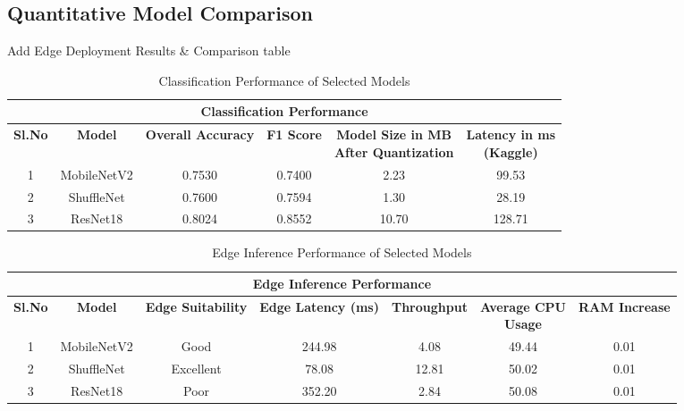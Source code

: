 \subsection {Quantitative Model Comparison}

Add Edge Deployment Results \& Comparison table


\begin{table}[htbp]
\centering

\footnotesize
\renewcommand{\arraystretch}{1.3}
\setlength{\tabcolsep}{5pt}

\begin{tabular}{|c|c|c|c|c|c|}
\hline
\multicolumn{6}{|c|}{\textbf{Classification Performance}} \\
\hline

\rowcolor{yellow}
\textbf{Sl.No} &
\textbf{Model} &
\textbf{Overall Accuracy} &
\textbf{F1 Score} &
\makecell{\textbf{Model Size in MB} \\ \textbf{After Quantization}} &
\makecell{\textbf{Latency in ms} \\ \textbf{(Kaggle)}} \\
\hline

1 & MobileNetV2 & 0.7530 & 0.7400 & 2.23 & 99.53 \\
\hline
2 & ShuffleNet  & 0.7600 & 0.7594 & 1.30 & 28.19 \\
\hline
3 & ResNet18    & 0.8024 & 0.8552 & 10.70 & 128.71 \\
\hline

\end{tabular}
\caption{Classification Performance of Selected Models}
\label{tab:classification_performance}
\end{table}

\begin{table}[htbp]
\centering

\scriptsize
\renewcommand{\arraystretch}{1.3}
\setlength{\tabcolsep}{5pt}

\begin{tabular}{|c|c|c|c|c|c|c|}
\hline
\multicolumn{7}{|c|}{\textbf{Edge Inference Performance}} \\
\hline

\rowcolor{yellow}
\textbf{Sl.No} &
\textbf{Model} &
\textbf{Edge Suitability} &
\textbf{Edge Latency (ms)} &
\textbf{Throughput} &
\makecell{\textbf{Average CPU} \\ \textbf{Usage}} &
\textbf{RAM Increase} \\
\hline

1 & MobileNetV2 & Good      & 244.98 & 4.08  & 49.44 & 0.01 \\
\hline
2 & ShuffleNet  & Excellent & 78.08  & 12.81 & 50.02 & 0.01 \\
\hline
3 & ResNet18    & Poor      & 352.20 & 2.84  & 50.08 & 0.01 \\
\hline

\end{tabular}
\caption{Edge Inference Performance of Selected Models}
\label{tab:edge_inference_performance}
\end{table}

